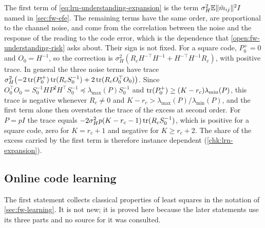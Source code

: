 \begin{remark}\label{rem:lrn-correction-sign}
The first term of \cref{eq:lrn-understanding-expansion} is the term $\sigma_H^2\mathbb{E}\Vert\hat m_{ij}\Vert^2I$ named in \cref{sec:fw-efe}. The remaining terms have the same order, are proportional to the channel noise, and come from the correlation between the noise and the response of the reading to the code error, which is the dependence that \cref{open:fw-understanding-risk} asks about. Their sign is not fixed. For a square code, $P_0^+=0$ and $O_0=H^{-1}$, so the correction is $\sigma_H^2(R_cH^{-\top}H^{-1}+H^{-\top}H^{-1}R_c)$, with positive trace. In general the three noise terms have trace $\sigma_H^2\bigl(-2\operatorname{tr}(P_0^+)\operatorname{tr}(R_cS_0^{-1})+2\operatorname{tr}(R_cO_0^\top O_0)\bigr)$. Since $O_0^\top O_0=S_0^{-1}HP^2H^\top S_0^{-1}\preceq\lambda_{\max}(P)S_0^{-1}$ and $\operatorname{tr}(P_0^+)\ge(K-r_c)\lambda_{\min}(P)$, this trace is negative whenever $R_c\ne0$ and $K-r_c>\lambda_{\max}(P)/\lambda_{\min}(P)$, and the first term alone then overstates the trace of the excess at second order. For $P=pI$ the trace equals $-2\sigma_H^2p(K-r_c-1)\operatorname{tr}(R_cS_0^{-1})$, which is positive for a square code, zero for $K=r_c+1$ and negative for $K\ge r_c+2$. The share of the excess carried by the first term is therefore instance dependent (\cref{chk:lrn-expansion}).
\end{remark}

\subsection{Online code learning}

The first statement collects classical properties of least squares in the notation of \cref{sec:fw-learning}. It is not new; it is proved here because the later statements use its three parts and no source for it was consulted.

